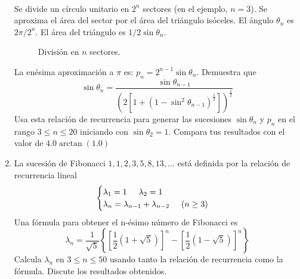 \documentclass[12pt]{article}
\begin{document}
\begin{enumerate}
\\
Se divide un c\'{i}rculo unitario en $2^{n}$ sectores (en el ejemplo, $n=3$). Se aproxima el \'{a}rea del sector por el \'{a}rea del tri\'{a}ngulo is\'{o}celes. El \'{a}ngulo $\theta_{n}$ es $2 \pi / 2^{n}$. El \'{a}rea del tri\'{a}ngulo es $1/2 \sin \theta_{n}$.
\\
\begin{figure}[H]
\centering
{}
\caption{Divisi\'{o}n en $n$ sectores.}
\end{figure}
La en\'{e}sima aproximaci\'{o}n a $\pi$ es: $p_{n}= 2^{n-1} \sin \theta_{n}$. Demuestra que
\[\sin \theta_{n} = \dfrac{\sin \theta_{n-1}}{\left( 2 \left[ 1+ (1-\sin^{2}\theta_{n-1})^{\frac{1}{2}} \right] \right)^{\frac{1}{2}}} \]
Usa esta relaci\'{o}n de recurrencia para generar las sucesiones $\sin \theta_{n}$ y $p_{n}$ en el rango $3 \leq n \leq 20$ iniciando con $\sin \theta_{2}=1$. Compara tus resultados con el valor de $4.0 \arctan(1.0)$
\item La sucesi\'{o}n de Fibonacci $1,1,2,3,5,8,13,\ldots$ est\'{a} definida por la relaci\'{o}n de recurrencia lineal
\begin{equation*}
\begin{cases}
\lambda_{1} = 1 \hspace{0.5cm} \lambda_{2}= 1 \\
\lambda_{n} = \lambda_{n-1} + \lambda_{n-2} \hspace{0.5cm} (n \geq 3)
\end{cases}
\end{equation*}
Una f\'{o}rmula para obtener el n-\'{e}simo n\'{u}mero de Fibonacci es
\[ \lambda_{n} = \dfrac{1}{\sqrt{5}} \left\lbrace \left[ \dfrac{1}{2} (1 + \sqrt{5}) \right]^{n} - \left[ \dfrac{1}{2} (1 - \sqrt{5}) \right]^{n} \right\rbrace \]
Calcula $\lambda_{n}$ en $3\leq n \leq 50$ usando tanto la relaci\'{o}n de recurrencia como la f\'{o}rmula. Discute los resultados obtenidos.
\end{enumerate}
\end{document}
